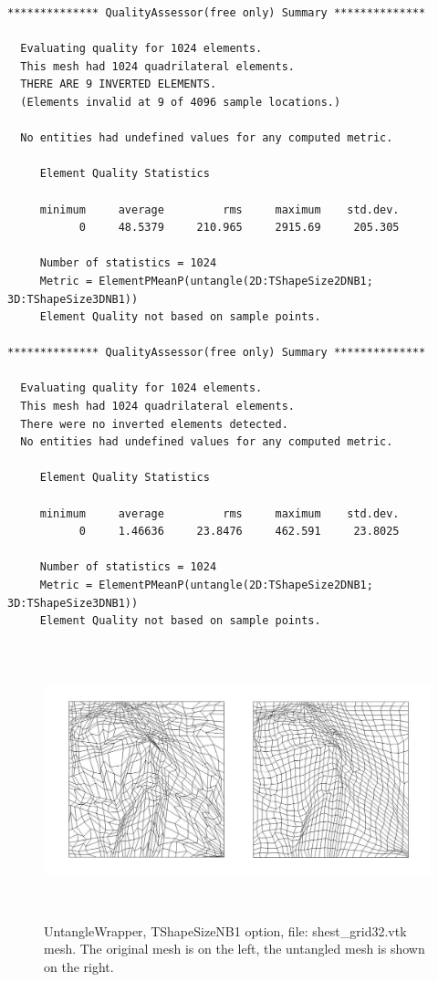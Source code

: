 \begin{verbatim}
************** QualityAssessor(free only) Summary **************

  Evaluating quality for 1024 elements.
  This mesh had 1024 quadrilateral elements.
  THERE ARE 9 INVERTED ELEMENTS.
  (Elements invalid at 9 of 4096 sample locations.)

  No entities had undefined values for any computed metric.

     Element Quality Statistics

     minimum     average         rms     maximum    std.dev.
           0     48.5379     210.965     2915.69     205.305

     Number of statistics = 1024
     Metric = ElementPMeanP(untangle(2D:TShapeSize2DNB1; 3D:TShapeSize3DNB1))
     Element Quality not based on sample points.

************** QualityAssessor(free only) Summary **************

  Evaluating quality for 1024 elements.
  This mesh had 1024 quadrilateral elements.
  There were no inverted elements detected.
  No entities had undefined values for any computed metric.

     Element Quality Statistics

     minimum     average         rms     maximum    std.dev.
           0     1.46636     23.8476     462.591     23.8025

     Number of statistics = 1024
     Metric = ElementPMeanP(untangle(2D:TShapeSize2DNB1; 3D:TShapeSize3DNB1))
     Element Quality not based on sample points.
\end{verbatim}


\begin{figure}[htbp]
\begin{center}
    \includegraphics[height=80mm]{figures/shest_grid32}
    \caption{UntangleWrapper, TShapeSizeNB1 option, file: shest\_grid32.vtk mesh. The original mesh is on the left, the untangled mesh is shown on the right.}
    \label{fig:shest_grid32}
\end{center}
\end{figure}

